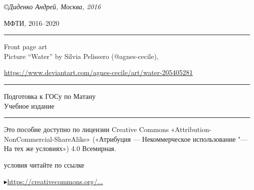 \slshape
\normalsize
{}
\thispagestyle{empty}
\medskip
\copyright\enspace Диденко Андрей, Москва, 2016

\medspace

МФТИ, 2016--2020
\center
\rule{\textwidth}{0.4pt}
\medspace

{\Huge Front page art}
\\[1\baselineskip]
Picture ``Water'' by Silvia Pelissero (@agnes-cecile),

\href{https://www.deviantart.com/agnes-cecile/art/water-205405281}{https://www.deviantart.com/agnes-cecile/art/water-205405281}

\rule{\textwidth}{0.4pt}
\medspace
\vspace*{7\baselineskip}

{\Huge Подготовка к ГОСу по Матану}
\\[2\baselineskip]
{\Large Учебное издание}

\vspace*{\fill}
\rule{\textwidth}{0.4pt}
\noindent
\begin{minipage}[t]{0.61\textwidth}
\quad\small Это пособие доступно по лицензии Creative Commons «Attribution-NonCommercial-ShareAlike» («Атрибуция — Некоммерческое использование "--- На тех же условиях») 4.0 Всемирная.

 условия читайте по ссылке

\qquad$\blacktriangleright$\href{https://creativecommons.org/licenses/by-nc-sa/4.0/deed.ru}{https://creativecommons.org/...}
\end{minipage}%
\hfill%
\begin{minipage}[t]{\dimexpr(0.4\textwidth-2mm)}
\end{minipage}
